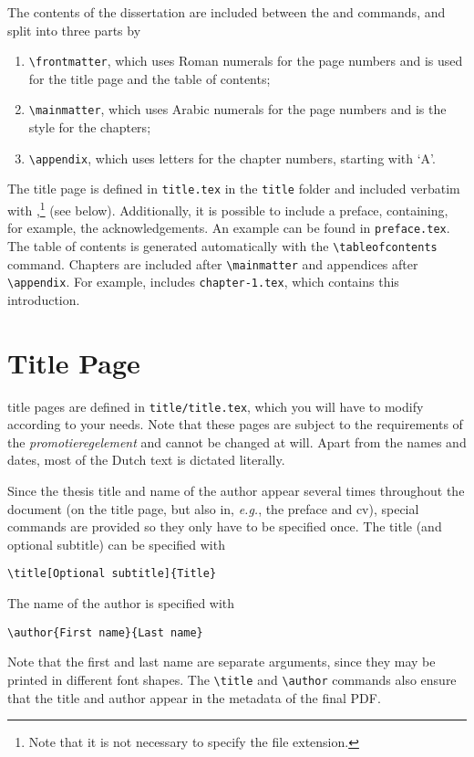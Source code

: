 The contents of the dissertation are included between the 
\verb|| and \verb|| commands, and split into three parts by
\begin{enumerate}
\item\verb|\frontmatter|, which uses Roman numerals for the page numbers and is used for the title page and the table of contents;
\item\verb|\mainmatter|, which uses Arabic numerals for the page numbers and is the style for the chapters;
\item\verb|\appendix|, which uses letters for the chapter numbers, starting with `A'.
\end{enumerate}
The title page is defined in \texttt{title.tex} in the \texttt{title} folder and included verbatim with \verb||,\footnote{Note that it is not necessary to specify the file extension.} (see below). Additionally, it is possible to include a preface, containing, for example, the acknowledgements. An example can be found in \texttt{preface.tex}. The table of contents is generated automatically with the \verb|\tableofcontents| command. Chapters are included after \verb|\mainmatter| and appendices after \verb|\appendix|. For example, \verb|| includes \texttt{chapter-1.tex}, which contains this introduction.

\section{Title Page}

 title pages are defined in \texttt{title/title.tex}, which you will have to modify according to your needs. Note that these pages are subject to the requirements of the \emph{promotieregelement} and cannot be changed at will. Apart from the names and dates, most of the Dutch text is dictated literally.

Since the thesis title and name of the author appear several times throughout the document (on the title page, but also in, \emph{e.g.}, the preface and cv), special commands are provided so they only have to be specified once. The title (and optional subtitle) can be specified with

\begin{verbatim}
\title[Optional subtitle]{Title}
\end{verbatim}
The name of the author is specified with
\begin{verbatim}
\author{First name}{Last name}
\end{verbatim}
Note that the first and last name are separate arguments, since they may be printed in different font shapes. The \verb|\title| and \verb|\author| commands also ensure that the title and author appear in the metadata of the final PDF.

